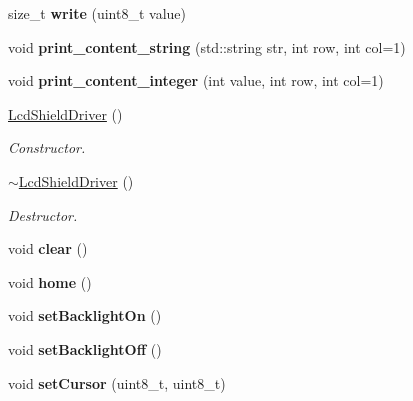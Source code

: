 \begin{DoxyCompactItemize}
size\+\_\+t {\bfseries write} (uint8\+\_\+t value)
\item 
\mbox{\label{classLcdShieldDriver_a893f217db662b34726d0684bb014f7d4}} 
void {\bfseries print\+\_\+content\+\_\+string} (std\+::string str, int row, int col=1)
\item 
\mbox{\label{classLcdShieldDriver_ae1a249341c06d6992767e8176ef96056}} 
void {\bfseries print\+\_\+content\+\_\+integer} (int value, int row, int col=1)
\item 
\mbox{\label{classLcdShieldDriver_a14d2027ac041be273d6b894a6d66bb1f}} 
\hyperlink{classLcdShieldDriver_a14d2027ac041be273d6b894a6d66bb1f}{Lcd\+Shield\+Driver} ()
\begin{DoxyCompactList}\small\item\em Constructor. \end{DoxyCompactList}\item 
\mbox{\label{classLcdShieldDriver_aaec080d1c36326c1e58642a7e28d85b1}} 
\hyperlink{classLcdShieldDriver_aaec080d1c36326c1e58642a7e28d85b1}{$\sim$\+Lcd\+Shield\+Driver} ()
\begin{DoxyCompactList}\small\item\em Destructor. \end{DoxyCompactList}\item 
\mbox{\label{classLcdShieldDriver_a43e151fc827a4d8d982bc2857b78262e}} 
void {\bfseries clear} ()
\item 
\mbox{\label{classLcdShieldDriver_a7bccc296eef476eb49984bdf8fdebb14}} 
void {\bfseries home} ()
\item 
\mbox{\label{classLcdShieldDriver_a68a86a7407fd3df5714f3351d657e499}} 
void {\bfseries set\+Backlight\+On} ()
\item 
\mbox{\label{classLcdShieldDriver_a81639e7553501343137be8984d7ea7d9}} 
void {\bfseries set\+Backlight\+Off} ()
\item 
\mbox{\label{classLcdShieldDriver_a6733a16dc0e1d58cfdfb4019ea2e6582}} 
void {\bfseries set\+Cursor} (uint8\+\_\+t, uint8\+\_\+t)

\end{DoxyCompactItemize}
